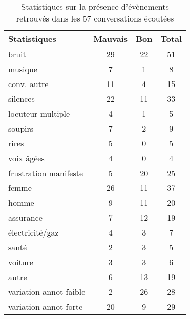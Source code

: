 \begin{table}[]
    \centering
    \begin{tabular}{|p{3cm}|c c c|}
         \hline
         Statistiques &Mauvais &Bon &Total \\
         \hline
         bruit &29 &22 &51 \\
         musique &7 &1 &8 \\
         conv. autre &11 &4 &15 \\
         silences &22 &11 &33 \\
         locuteur multiple &4 &1 &5 \\
         soupirs &7 &2 &9 \\
         rires &5 &0 &5 \\
         voix âgées &4 &0 &4 \\
         frustration manifeste &5 &20 &25 \\
         \hline
         femme &26 &11 &37 \\
         homme &9 &11 &20 \\
         \hline
         assurance &7 &12 &19 \\
         électricité/gaz &4 &3 &7 \\
         santé &2 &3 &5 \\
         voiture &3 &3 &6 \\
         autre &6 &13 &19 \\
         \hline
         variation annot faible &2 &26 &28 \\
         variation annot forte &20 &9 &29 \\
         \hline
    \end{tabular}
    \caption{Statistiques sur la présence d'évènements retrouvés dans les 57 conversations écoutées}
    \label{tab:stats}
\end{table}
